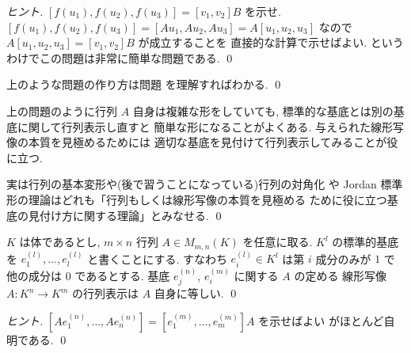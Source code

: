 \documentclass[12pt,twoside]{jarticle}
\begin{document}
\begin{proof}[ヒント]
  $[f(u_1),f(u_2),f(u_3)]=[v_1,v_2]B$ を示せ.
  $[f(u_1),f(u_2),f(u_3)]=[Au_1,Au_2,Au_3]=A[u_1,u_2,u_3]$ 
  なので $A[u_1,u_2,u_3]=[v_1,v_2]B$ が成立することを
  直接的な計算で示せばよい.
  というわけでこの問題は非常に簡単な問題である.
  \qed
\end{proof}

\begin{rem}[行列の基本変形との関係]
  上のような問題の作り方は問題  を理解すればわかる. \qed
\end{rem}

\begin{rem}[標準的な基底以外のより適切な基底を見付けることの重要性]
  上の問題のように行列 $A$ 自身は複雑な形をしていても,
  標準的な基底とは別の基底に関して行列表示し直すと
  簡単な形になることがよくある.
  与えられた線形写像の本質を見極めるためには
  適切な基底を見付けて行列表示してみることが役に立つ.

  実は行列の基本変形や(後で習うことになっている)行列の対角化
  や Jordan 標準形の理論はどれも「行列もしくは線形写像の本質を見極める
  ために役に立つ基底の見付け方に関する理論」とみなせる.
  \qed
\end{rem}


\begin{question}
  \label{q:A->A}
  $K$ は体であるとし, $m\times n$ 行列 $A\in M_{m,n}(K)$ を任意に取る.
  $K^l$ の標準的基底を $e^{(l)}_1,\ldots,e^{(l)}_l$ と書くことにする.
  すなわち $e^{(l)}_i\in K^l$ は第 $i$ 成分のみが $1$ で
  他の成分は $0$ であるとする.
  基底 $e^{(n)}_j$, $e^{(m)}_i$ に関する $A$ の定める
  線形写像 $A:K^n\to K^m$ の行列表示は $A$ 自身に等しい.
  \qed
\end{question}

\begin{proof}[ヒント]
  $[Ae^{(n)}_1,\ldots,Ae^{(n)}_n]=[e^{(m)}_1,\ldots,e^{(m)}_m]A$ を示せばよい
  がほとんど自明である. \qed
\end{proof}

\end{document}
